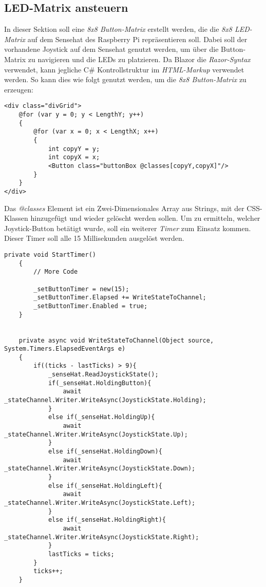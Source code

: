\subsection{LED-Matrix ansteuern}
\label{subsec:ledMatrix}
In dieser Sektion soll eine \emph{8x8 Button-Matrix} erstellt werden, die die \emph{8x8
LED-Matrix} auf dem Sensehat des Raspberry Pi repräsentieren soll. Dabei soll der vorhandene
Joystick auf dem Sensehat genutzt werden, um über die Button-Matrix zu navigieren und die
LEDs zu platzieren.
\newline
\newline
Da Blazor die \emph{Razor-Syntax} verwendet, kann jegliche C\# Kontrollstruktur im
\emph{HTML-Markup} verwendet werden. So kann dies wie folgt genutzt werden, um die \emph{8x8
Button-Matrix} zu erzeugen:

\begin{lstlisting}[language={[Sharp]C}, caption=Button-Matrix,
    label=lst:ButtonMatrix]
<div class="divGrid">
    @for (var y = 0; y < LengthY; y++)
    {
        @for (var x = 0; x < LengthX; x++)
        {
            int copyY = y;
            int copyX = x;
            <Button class="buttonBox @classes[copyY,copyX]"/>
        }
    }
</div>
\end{lstlisting}

Das \emph{@classes} Element ist ein Zwei-Dimensionales Array aus Strings, mit der
CSS-Klassen hinzugefügt und wieder gelöscht werden sollen. Um zu ermitteln, welcher
Joystick-Button betätigt wurde, soll ein weiterer
\emph{Timer} zum Einsatz kommen. Dieser Timer soll alle 15 Millisekunden ausgelöst werden.

\begin{lstlisting}[language={[Sharp]C}, caption=Timer: _setButtonTimer,
    label=lst:ButtonTimer]
    private void StartTimer()
    {
        // More Code

        _setButtonTimer = new(15);
        _setButtonTimer.Elapsed += WriteStateToChannel;
        _setButtonTimer.Enabled = true;
    }


    private async void WriteStateToChannel(Object source, System.Timers.ElapsedEventArgs e)
    {
        if((ticks - lastTicks) > 9){
            _senseHat.ReadJoystickState();
            if(_senseHat.HoldingButton){
                await _stateChannel.Writer.WriteAsync(JoystickState.Holding);
            }
            else if(_senseHat.HoldingUp){
                await _stateChannel.Writer.WriteAsync(JoystickState.Up);
            }
            else if(_senseHat.HoldingDown){
                await _stateChannel.Writer.WriteAsync(JoystickState.Down);
            }
            else if(_senseHat.HoldingLeft){
                await _stateChannel.Writer.WriteAsync(JoystickState.Left);
            }
            else if(_senseHat.HoldingRight){
                await _stateChannel.Writer.WriteAsync(JoystickState.Right);
            }
            lastTicks = ticks;
        }
        ticks++;
    }
\end{lstlisting}

